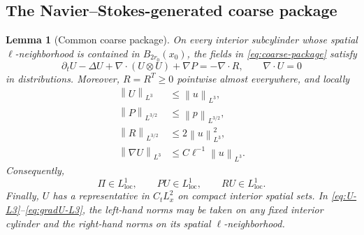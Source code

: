 \documentclass[11pt]{article}
\numberwithin{equation}{section}
\newtheorem{lemma}[theorem]{Lemma}
\newcommand{\norm}[2]{\left\lVert #1\right\rVert_{#2}}
\begin{document}
\subsection{The Navier--Stokes-generated coarse package}\label{sec:package}

\begin{lemma}[Common coarse package]\label{lem:coarse-package}
On every interior subcylinder whose spatial \(\ell\)-neighborhood is contained in \(B_{2r_0}(x_0)\), the fields in \eqref{eq:coarse-package} satisfy
\begin{equation}\label{eq:coarse-momentum}
\partial_tU-\Delta U+\nabla\cdot(U\otimes U)+\nabla P
=-\nabla\cdot R,
\qquad
\nabla\cdot U=0
\end{equation}
in distributions. Moreover, \(R=R^T\ge0\) pointwise almost everywhere, and locally
\begin{align}
\norm{U}{L^3}&\le\norm{u}{L^3},
\label{eq:U-L3}
\\
\norm{P}{L^{3/2}}&\le\norm{p}{L^{3/2}},
\label{eq:P-L32}
\\
\norm{R}{L^{3/2}}&\le2\norm{u}{L^3}^2,
\label{eq:R-L32}
\\
\norm{\nabla U}{L^3}&\le C\ell^{-1}\norm{u}{L^3}.
\label{eq:gradU-L3}
\end{align}
Consequently,
\begin{equation}\label{eq:Pi-L1}
\Pi\in L^1_{\mathrm{loc}},
\qquad
PU\in L^1_{\mathrm{loc}},
\qquad
RU\in L^1_{\mathrm{loc}}.
\end{equation}
Finally, \(U\) has a representative in \(C_tL^2_x\) on compact interior spatial sets. In \eqref{eq:U-L3}--\eqref{eq:gradU-L3}, the left-hand norms may be taken on any fixed interior cylinder and the right-hand norms on its spatial \(\ell\)-neighborhood.
\end{lemma}
\end{document}
